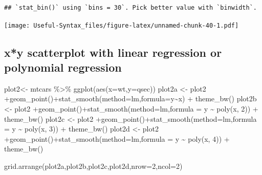\documentclass[
]{book}
\newenvironment{Shaded}{\begin{snugshade}}{\end{snugshade}}
\newcommand{\AttributeTok}[1]{\textcolor[rgb]{0.77,0.63,0.00}{#1}}
\newcommand{\DecValTok}[1]{\textcolor[rgb]{0.00,0.00,0.81}{#1}}
\newcommand{\FunctionTok}[1]{\textcolor[rgb]{0.00,0.00,0.00}{#1}}
\newcommand{\NormalTok}[1]{#1}
\newcommand{\OtherTok}[1]{\textcolor[rgb]{0.56,0.35,0.01}{#1}}
\newcommand{\SpecialCharTok}[1]{\textcolor[rgb]{0.00,0.00,0.00}{#1}}
\newcommand{\StringTok}[1]{\textcolor[rgb]{0.31,0.60,0.02}{#1}}
\begin{document}
\begin{verbatim}
## `stat_bin()` using `bins = 30`. Pick better value with `binwidth`.
\end{verbatim}

\texttt{[image: Useful-Syntax\_files/figure-latex/unnamed-chunk-40-1.pdf]}

\hypertarget{xy-scatterplot-with-linear-regression-or-polynomial-regression}{%
\subsection{x*y scatterplot with linear regression or polynomial regression}\label{xy-scatterplot-with-linear-regression-or-polynomial-regression}}

\begin{Shaded}
\begin{Highlighting}[]
\NormalTok{plot2}\OtherTok{\textless{}{-}}\NormalTok{ mtcars }\SpecialCharTok{\%\textgreater{}\%} \FunctionTok{ggplot}\NormalTok{(}\FunctionTok{aes}\NormalTok{(}\AttributeTok{x=}\NormalTok{wt,}\AttributeTok{y=}\NormalTok{qsec))}
\NormalTok{plot2a }\OtherTok{\textless{}{-}}\NormalTok{ plot2 }\SpecialCharTok{+}\FunctionTok{geom\_point}\NormalTok{()}\SpecialCharTok{+}\FunctionTok{stat\_smooth}\NormalTok{(}\AttributeTok{method=}\StringTok{\textquotesingle{}lm\textquotesingle{}}\NormalTok{,}\AttributeTok{formula=}\NormalTok{y}\SpecialCharTok{\textasciitilde{}}\NormalTok{x) }\SpecialCharTok{+} \FunctionTok{theme\_bw}\NormalTok{()}
\NormalTok{plot2b }\OtherTok{\textless{}{-}}\NormalTok{ plot2 }\SpecialCharTok{+}\FunctionTok{geom\_point}\NormalTok{()}\SpecialCharTok{+}\FunctionTok{stat\_smooth}\NormalTok{(}\AttributeTok{method=}\StringTok{\textquotesingle{}lm\textquotesingle{}}\NormalTok{,}\AttributeTok{formula =}\NormalTok{ y }\SpecialCharTok{\textasciitilde{}} \FunctionTok{poly}\NormalTok{(x, }\DecValTok{2}\NormalTok{)) }\SpecialCharTok{+} \FunctionTok{theme\_bw}\NormalTok{()}
\NormalTok{plot2c }\OtherTok{\textless{}{-}}\NormalTok{ plot2 }\SpecialCharTok{+}\FunctionTok{geom\_point}\NormalTok{()}\SpecialCharTok{+}\FunctionTok{stat\_smooth}\NormalTok{(}\AttributeTok{method=}\StringTok{\textquotesingle{}lm\textquotesingle{}}\NormalTok{,}\AttributeTok{formula =}\NormalTok{ y }\SpecialCharTok{\textasciitilde{}} \FunctionTok{poly}\NormalTok{(x, }\DecValTok{3}\NormalTok{)) }\SpecialCharTok{+} \FunctionTok{theme\_bw}\NormalTok{()}
\NormalTok{plot2d }\OtherTok{\textless{}{-}}\NormalTok{ plot2 }\SpecialCharTok{+}\FunctionTok{geom\_point}\NormalTok{()}\SpecialCharTok{+}\FunctionTok{stat\_smooth}\NormalTok{(}\AttributeTok{method=}\StringTok{\textquotesingle{}lm\textquotesingle{}}\NormalTok{,}\AttributeTok{formula =}\NormalTok{ y }\SpecialCharTok{\textasciitilde{}} \FunctionTok{poly}\NormalTok{(x, }\DecValTok{4}\NormalTok{)) }\SpecialCharTok{+} \FunctionTok{theme\_bw}\NormalTok{()}

\FunctionTok{grid.arrange}\NormalTok{(plot2a,plot2b,plot2c,plot2d,}\AttributeTok{nrow=}\DecValTok{2}\NormalTok{,}\AttributeTok{ncol=}\DecValTok{2}\NormalTok{)}
\end{Highlighting}
\end{Shaded}
\end{document}
